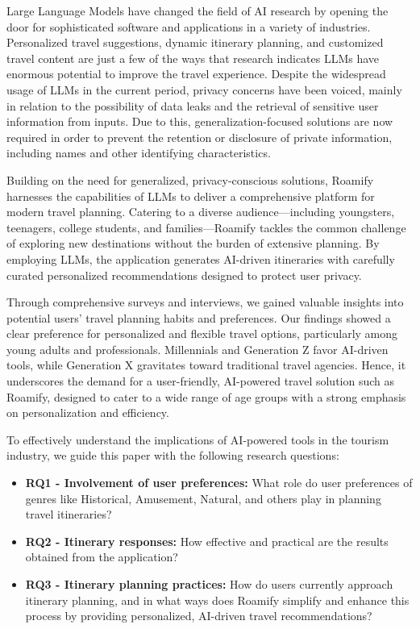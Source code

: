 \documentclass[sigconf,authordraft]{acmart}
\begin{document}
Large Language Models have changed the field of AI research by opening the door for sophisticated software and applications in a variety of industries. Personalized travel suggestions, dynamic itinerary planning, and customized travel content are just a few of the ways that research indicates LLMs have enormous potential to improve the travel experience\cite{ref1}. Despite the widespread usage of LLMs in the current period, privacy concerns have been voiced, mainly in relation to the possibility of data leaks and the retrieval of sensitive user information from inputs\cite{ref2}. Due to this, generalization-focused solutions are now required in order to prevent the retention or disclosure of private information, including names and other identifying characteristics.

Building on the need for generalized, privacy-conscious solutions, Roamify harnesses the capabilities of LLMs to deliver a comprehensive platform for modern travel planning. Catering to a diverse audience—including youngsters, teenagers, college students, and families—Roamify tackles the common challenge of exploring new destinations without the burden of extensive planning. By employing LLMs, the application generates AI-driven itineraries with carefully curated personalized recommendations designed to protect user privacy.

Through comprehensive surveys and interviews, we gained valuable insights into potential users' travel planning habits and preferences. Our findings showed a clear preference for personalized and flexible travel options, particularly among young adults and professionals. Millennials and Generation Z favor AI-driven tools, while Generation X gravitates toward traditional travel agencies. Hence, it underscores the demand for a user-friendly, AI-powered travel solution such as Roamify, designed to cater to a wide range of age groups with a strong emphasis on personalization and efficiency.

To effectively understand the implications of AI-powered tools in the tourism industry, we guide this paper with the following research questions:

\begin{itemize}
    \item \textbf{RQ1 - Involvement of user preferences:} What role do user preferences of genres like Historical, Amusement, Natural, and others play in planning travel itineraries?
    \item \textbf{RQ2 - Itinerary responses:} How effective and practical are the results obtained from the application?
    \item \textbf{RQ3 - Itinerary planning practices:} How do users currently approach itinerary planning, and in what ways does Roamify simplify and enhance this process by providing personalized, AI-driven travel recommendations?
\end{itemize}
\end{document}
